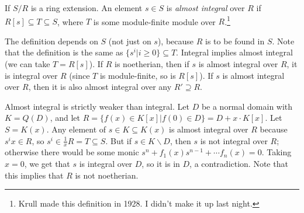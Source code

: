  \begin{definition}
   If $S/R$ is a ring extension. An element $s\in S$ is \emph{almost integral} over $R$
   if $R[s]\subseteq T\subseteq S$, where $T$ is some module-finite module over
   $R$.\footnote{Krull made this definition in 1928. I didn't make it up last night.}
 \end{definition}
 \begin{remark}
   The definition depends on $S$ (not just on $s$), because $R$ is to be found in $S$.
   Note that the definition is the same as $\{s^i|i\ge 0\}\subseteq T$. Integral implies
   almost integral (we can take $T=R[s]$). If $R$ is noetherian, then if $s$ is almost
   integral over $R$, it is integral over $R$ (since $T$ is module-finite, so is $R[s]$).
   If $s$ is almost integral over $R$, then it is also almost integral over any
   $R'\supseteq R$.
 \end{remark}
 \begin{example}[$D+(x)$ construction] Almost integral is strictly weaker than integral.
  Let $D$ be a normal domain with $K=Q(D)$, and let $R=\{f(x)\in K[x]|f(0)\in D\} =
  D+x\cdot K[x]$. Let $S=K(x)$. Any element of $s\in K\subseteq K(x)$ is almost integral
  over $R$ because $s^i x\in R$, so $s^i\in \frac{1}{x}R = T\subseteq S$. But if $s\in
  K\smallsetminus D$, then $s$ is not integral over $R$; otherwise there would be some
  monic $s^n+f_1(x)s^{n-1}+\cdots f_n(x)=0$. Taking $x=0$, we get that $s$ is integral
  over $D$, so it is in $D$, a contradiction. Note that this implies that $R$ is not
  noetherian.
 \end{example}
